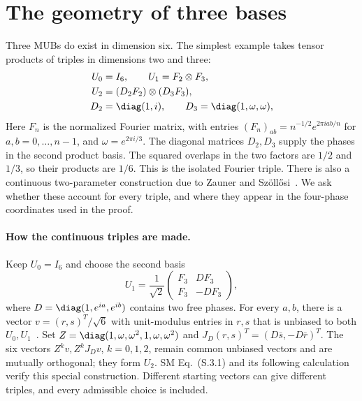 \section{The geometry of three bases}
\label{sec:triples}
Three MUBs do exist in dimension six. The simplest example takes tensor products of triples in dimensions two and three:
\begin{equation}
 \begin{aligned}
 U_0&=I_6,\qquad U_1=F_2\otimes F_3,\\
 U_2&=(D_2F_2)\otimes(D_3F_3),\\
 D_2&=\diag(1,i),\qquad D_3=\diag(1,\omega,\omega),
 \end{aligned}
 \label{eq:product}
\end{equation}
Here $F_n$ is the normalized Fourier matrix, with entries $(F_n)_{ab}=n^{-1/2}e^{2\pi iab/n}$ for $a,b=0,\ldots,n-1$, and $\omega=e^{2\pi i/3}$. The diagonal matrices $D_2,D_3$ supply the phases in the second product basis. The squared overlaps in the two factors are $1/2$ and $1/3$, so their products are $1/6$. This is the isolated Fourier triple. There is also a continuous two-parameter construction due to Zauner and Sz\"oll\H{o}si~\cite{Zauner1999,Szollosi2010Hypocycloids,Jaming2009}. We ask whether these account for every triple, and where they appear in the four-phase coordinates used in the proof.

\paragraph*{How the continuous triples are made.}
Keep $U_0=I_6$ and choose the second basis
\begin{equation}
 U_1=\frac1{\sqrt2}
 \begin{pmatrix}F_3&DF_3\\F_3&-DF_3\end{pmatrix},
 \label{eq:Qmain}
\end{equation}
where $D=\diag(1,e^{ia},e^{ib})$ contains two free phases. For every $a,b$, there is a vector $v=(r,s)^T/\sqrt6$ with unit-modulus entries in $r,s$ that is unbiased to both $U_0,U_1$~\cite{IdelWolf2015}. Set $Z=\diag(1,\omega,\omega^2,1,\omega,\omega^2)$ and $J_D(r,s)^T=(D\bar s,-D\bar r)^T$. The six vectors $Z^kv,Z^kJ_Dv$, $k=0,1,2$, remain common unbiased vectors and are mutually orthogonal; they form $U_2$. SM Eq.~(S.3.1) and its following calculation verify this special construction. Different starting vectors can give different triples, and every admissible choice is included.

